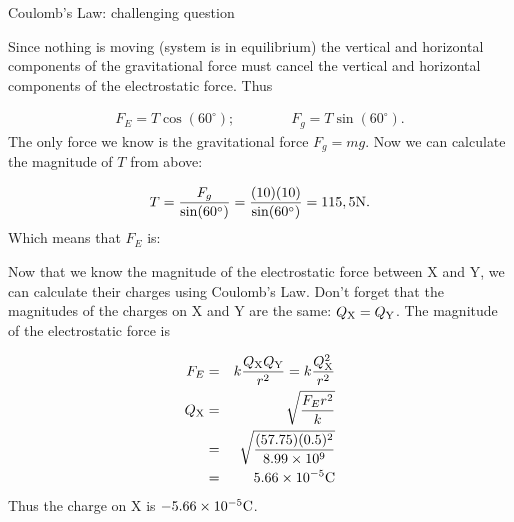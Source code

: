 \begin{wex}{Coulomb's Law: challenging question}
{
Since nothing is moving (system is in equilibrium) the vertical
and horizontal components of the gravitational force must cancel the vertical and horizontal components of the electrostatic force. Thus

\begin{eqnarray*}
F_E=T\cos(60^{\circ});\qquad\qquad F_g=T\sin(60^{\circ}).
\end{eqnarray*}
The only force we know is the gravitational force $F_g=mg$. Now we
can calculate the magnitude of $T$ from above:

\begin{eqnarray*}
T=\frac{F_g}{\sin(60^{\circ})}=\frac{(10)(10)}{\sin(60^ {\circ})}=115,5{\rm N}.
\end{eqnarray*}
Which means that $F_E$ is:


\westep{} Now that we know the magnitude of the electrostatic
force between X and Y, we can calculate their charges using
Coulomb's Law. Don't forget that the magnitudes of the charges on
X and Y are the same: $Q_{\rm X}=Q_{\rm Y}$. The magnitude of
the electrostatic force is

\begin{eqnarray*}
F_E &=& k\frac{Q_{\rm X}Q_{\rm Y}}{r^2}= k\frac{Q_{\rm X}^2}{r^2}\\
Q_{\rm X}&=&\sqrt{\frac{F_E r^2}{k}}\\
&=&\sqrt{\frac{(57.75)(0.5)^2}{8.99\times10^{9}}}\\
&=&5.66\times10^{-5}{\rm C}
\end{eqnarray*}
Thus the charge on X is $-5.66\times10^{-5}{\rm C}$.}
\end{wex}


